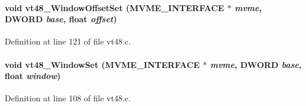 \paragraph[{vt48\_\-WindowOffsetSet}]{\setlength{\rightskip}{0pt plus 5cm}void vt48\_\-WindowOffsetSet ({\bf MVME\_\-INTERFACE} $\ast$ {\em mvme}, \/  {\bf DWORD} {\em base}, \/  float {\em offset})}\hfill\label{vt48_8h_afd51ba644c73189293c6fab7de739533}


Definition at line 121 of file vt48.c.
\paragraph[{vt48\_\-WindowSet}]{\setlength{\rightskip}{0pt plus 5cm}void vt48\_\-WindowSet ({\bf MVME\_\-INTERFACE} $\ast$ {\em mvme}, \/  {\bf DWORD} {\em base}, \/  float {\em window})}\hfill\label{vt48_8h_a5643216541b3d8c374948f45ec2d22f1}


Definition at line 108 of file vt48.c.